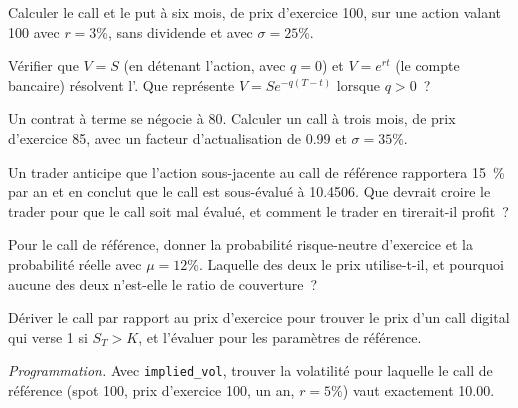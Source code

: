 \begin{exercise}[$\star$]\label{exo:dv:black-scholes-three-ways:1}
Calculer le call et le put à six mois, de prix d'exercice 100, sur une action valant 100 avec $r=3\%$,
sans dividende et avec $\sigma=25\%$.
\end{exercise}

\begin{exercise}[$\star$]\label{exo:dv:black-scholes-three-ways:2}
Vérifier que $V=S$ (en détenant l'action, avec $q=0$) et $V=e^{rt}$ (le compte bancaire)
résolvent l'. Que représente $V=Se^{-q(T-t)}$ lorsque
$q>0$~?
\end{exercise}

\begin{exercise}[$\star$]\label{exo:dv:black-scholes-three-ways:3}
Un contrat à terme se négocie à 80. Calculer un call à trois mois, de prix d'exercice 85, avec un
facteur d'actualisation de 0.99 et $\sigma=35\%$.
\end{exercise}

\begin{exercise}[$\star\star$]\label{exo:dv:black-scholes-three-ways:4}
Un trader anticipe que l'action sous-jacente au call de référence rapportera 15~\% par an et
en conclut que le call est sous-évalué à 10.4506. Que devrait croire le trader pour que le
call soit mal évalué, et comment le trader en tirerait-il profit~?
\end{exercise}

\begin{exercise}[$\star\star$]\label{exo:dv:black-scholes-three-ways:5}
Pour le call de référence, donner la probabilité risque-neutre d'exercice et la
probabilité réelle avec $\mu=12\%$. Laquelle des deux le prix utilise-t-il, et pourquoi
aucune des deux n'est-elle le ratio de couverture~?
\end{exercise}

\begin{exercise}[$\star\star$]\label{exo:dv:black-scholes-three-ways:6}
Dériver le call par rapport au prix d'exercice pour trouver le prix d'un
call digital qui verse 1 si $S_T>K$, et l'évaluer pour les paramètres de référence.
\end{exercise}

\begin{exercise}[$\star\star\star$]\label{exo:dv:black-scholes-three-ways:7}
\emph{Programmation.} Avec \texttt{implied\_vol}, trouver la volatilité pour laquelle le
call de référence (spot 100, prix d'exercice 100, un an, $r=5\%$) vaut exactement 10.00.
\end{exercise}

